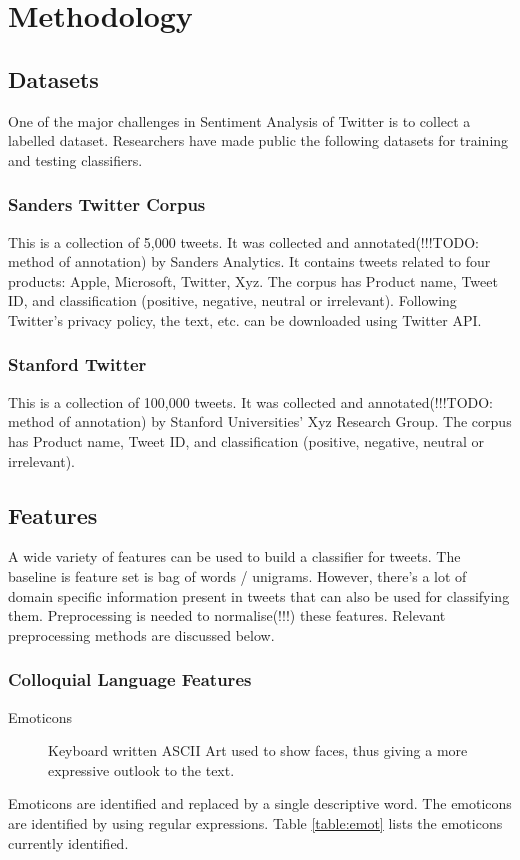 \section{Methodology}

\subsection{Datasets}
One of the major challenges in Sentiment Analysis of Twitter is to collect a labelled dataset.
Researchers have made public the following datasets for training and testing classifiers.

\subsubsection{Sanders Twitter Corpus}
This is a collection of 5,000 tweets. It was collected and annotated(!!!TODO: method of annotation) by Sanders Analytics.
It contains tweets related to four products: Apple, Microsoft, Twitter, Xyz.
The corpus has Product name, Tweet ID, and classification (positive, negative, neutral or irrelevant).
Following Twitter's privacy policy, the text, etc. can be downloaded using Twitter API.

\subsubsection{Stanford Twitter}
This is a collection of 100,000 tweets. It was collected and annotated(!!!TODO: method of annotation)
by Stanford Universities' Xyz Research Group.
The corpus has Product name, Tweet ID, and classification (positive, negative, neutral or irrelevant).

\subsection{Features}
A wide variety of features can be used to build a classifier for tweets.
The baseline is feature set is bag of words / unigrams.
However, there's a lot of domain specific information present in tweets that can also be used for classifying them.
Preprocessing is needed to normalise(!!!) these features. Relevant preprocessing methods are discussed below.

\subsubsection{Colloquial Language Features}
	\begin{description}
	\item[Emoticons]{Keyboard written ASCII Art used to show faces, thus giving a more expressive outlook to the text.}
	\end{description}
Emoticons are identified and replaced by a single descriptive word.
The emoticons are identified by using regular expressions.
Table \ref{table:emot} lists the emoticons currently identified.

